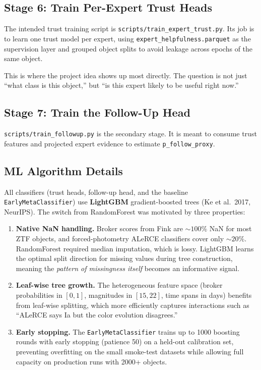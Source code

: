 \documentclass[11pt]{article}
\newcommand{\code}[1]{\texttt{#1}}
\begin{document}
\subsection{Stage 6: Train Per-Expert Trust Heads}

The intended trust training script is \code{scripts/train\_expert\_trust.py}. Its job is to learn one trust model per expert, using \code{expert\_helpfulness.parquet} as the supervision layer and grouped object splits to avoid leakage across epochs of the same object.

This is where the project idea shows up most directly. The question is not just ``what class is this object,'' but ``is this expert likely to be useful right now.''

\subsection{Stage 7: Train the Follow-Up Head}

\code{scripts/train\_followup.py} is the secondary stage. It is meant to consume trust features and projected expert evidence to estimate \code{p\_follow\_proxy}.

\subsection{ML Algorithm Details}

All classifiers (trust heads, follow-up head, and the baseline \code{EarlyMetaClassifier}) use \textbf{LightGBM} gradient-boosted trees (Ke et al.\ 2017, NeurIPS). The switch from RandomForest was motivated by three properties:

\begin{enumerate}
\item \textbf{Native NaN handling.} Broker scores from Fink are ${\sim}100\%$ NaN for most ZTF objects, and forced-photometry ALeRCE classifiers cover only ${\sim}20\%$. RandomForest required median imputation, which is lossy. LightGBM learns the optimal split direction for missing values during tree construction, meaning the \emph{pattern of missingness itself} becomes an informative signal.

\item \textbf{Leaf-wise tree growth.} The heterogeneous feature space (broker probabilities in $[0,1]$, magnitudes in $[15,22]$, time spans in days) benefits from leaf-wise splitting, which more efficiently captures interactions such as ``ALeRCE says Ia but the color evolution disagrees.''

\item \textbf{Early stopping.} The \code{EarlyMetaClassifier} trains up to 1000 boosting rounds with early stopping (patience 50) on a held-out calibration set, preventing overfitting on the small smoke-test datasets while allowing full capacity on production runs with 2000+ objects.
\end{enumerate}
\end{document}
